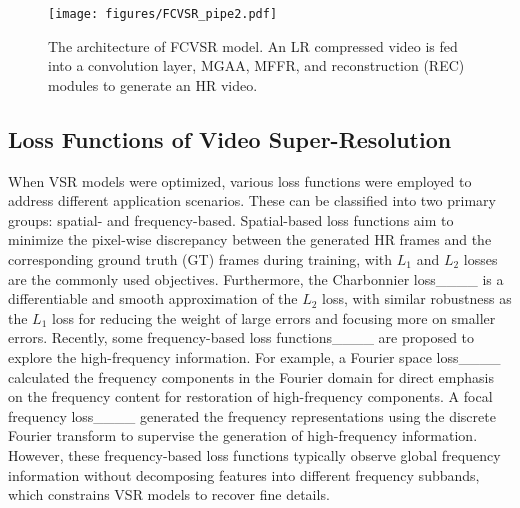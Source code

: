 

\begin{figure*}[!t]
\centering
\texttt{[image: figures/FCVSR\_pipe2.pdf]}
\caption{ The architecture of FCVSR model. An LR compressed video is fed into a convolution layer, MGAA, MFFR, and reconstruction (REC) modules to generate an HR video.}
\label{fig_pipeline}
\end{figure*}

\subsection{Loss Functions of Video Super-Resolution}

When VSR models were optimized, various loss functions were employed to address different application scenarios. 
These can be classified into two primary groups: spatial- and frequency-based. 
Spatial-based loss functions aim to minimize the pixel-wise discrepancy between the generated HR frames and the corresponding ground truth (GT) frames during training, with $L_1$ and $L_2$ losses are the commonly used objectives. Furthermore, the Charbonnier loss____ is a differentiable and smooth approximation of the $L_2$ loss, with similar robustness as the $L_1$ loss for reducing the weight of large errors and focusing more on smaller errors. Recently, some frequency-based loss functions____ are proposed to explore the high-frequency information. For example, a Fourier space loss____ calculated the frequency components in the Fourier domain for direct emphasis on the frequency content for restoration of high-frequency components. A focal frequency loss____ generated the frequency representations using the discrete Fourier transform to supervise the generation of high-frequency information. However, these frequency-based loss functions typically observe global frequency information without decomposing features into different frequency subbands, which constrains VSR models to recover fine details. 

